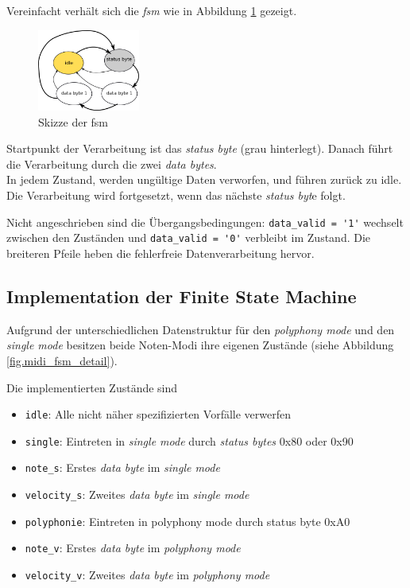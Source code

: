 Vereinfacht verhält sich die \textit{fsm} wie in Abbildung \ref{fig.midi_fsm_skizze} gezeigt. 

\begin{figure}[H]
	\includegraphics[width=0.3\textwidth]{images/midi_control/fsm_grob_2.png}
	\caption{Skizze der fsm}
	\label{fig.midi_fsm_skizze}
\end{figure}

Startpunkt der Verarbeitung ist das \textit{status byte} (grau hinterlegt). Danach führt die Verarbeitung durch die zwei \textit{data bytes}.\\
In jedem Zustand, werden ungültige Daten verworfen, und führen zurück zu idle. Die Verarbeitung wird fortgesetzt, wenn das nächste \textit{status byt}e folgt.

Nicht angeschrieben sind die Übergangsbedingungen: \lstinline|data_valid = '1'| wechselt zwischen den Zuständen und \lstinline|data_valid = '0'| verbleibt im Zustand. Die breiteren Pfeile heben die fehlerfreie Datenverarbeitung hervor.

\subsection{Implementation der Finite State Machine}

Aufgrund der unterschiedlichen Datenstruktur für den \textit{polyphony mode} und den \textit{single mode} besitzen beide Noten-Modi ihre eigenen Zustände (siehe Abbildung \ref{fig.midi_fsm_detail}).

Die implementierten Zustände sind

\begin{itemize}
	\item \lstinline|idle|: Alle nicht näher spezifizierten Vorfälle verwerfen
	\item \lstinline|single|: Eintreten in  \textit{single mode} durch \textit{status bytes} 0x80 oder 0x90
	\item \lstinline|note_s|: Erstes \textit{data byte} im  \textit{single mode}
	\item \lstinline|velocity_s|: Zweites \textit{data byte} im \textit{single mode}
	\item \lstinline|polyphonie|: Eintreten in polyphony mode durch status byte 0xA0
	\item \lstinline|note_v|: Erstes \textit{data byte} im  \textit{polyphony mode}
	\item \lstinline|velocity_v|: Zweites \textit{data byte} im  \textit{polyphony mode}
\end{itemize}
\bigskip

